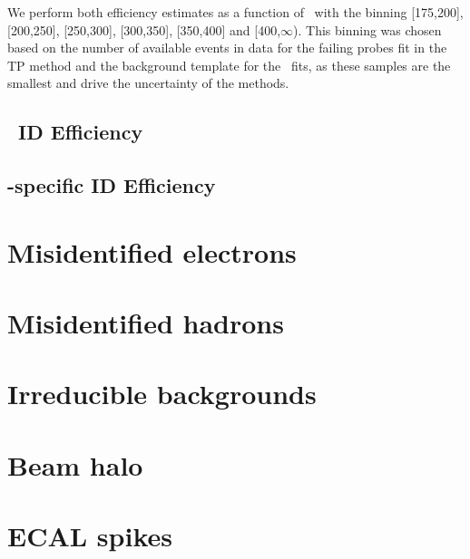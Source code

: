 We perform both efficiency estimates as a function of \pt\ with the binning [175,200], [200,250], [250,300], [300,350], [350,400] and [400,$\infty$). 
This binning was chosen based on the number of available events in data for the failing probes fit in the TP method and the background template for the \sieie\ fits, as these samples are the smallest and drive the uncertainty of the methods.

\subsection{\egamma\ ID Efficiency}
\label{sec:idsf}



\subsection{\Pgg-specific ID Efficiency}
\label{sec:pvsf}



\section{Misidentified electrons}
\label{sec:efake}



\section{Misidentified hadrons}
\label{sec:hfake}



\section{Irreducible backgrounds}
\label{sec:irreducible}



\section{Beam halo}
\label{sec:halo_estimate}



\section{ECAL spikes}
\label{sec:spike_estimate}

